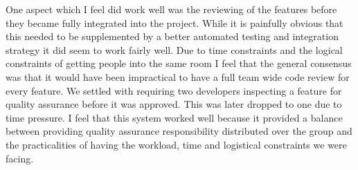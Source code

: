 \documentclass[paper=a4, fontsize=11pt]{scrartcl}	%
\numberwithin{equation}{section}															%
\numberwithin{figure}{section}																%
\numberwithin{table}{section}
\begin{document}
One aspect which I feel did work well was the reviewing of the features before they became fully integrated into the project. While it is painfully obvious that this needed to be supplemented by a better automated testing and integration strategy it did seem to work fairly well. Due to time constraints and the logical constraints of getting people into the same room I feel that the general consensus was that it would have been impractical to have a full team wide code review for every feature. We settled with requiring two developers inspecting a feature for quality assurance before it was approved. This was later dropped to one due to time pressure. I feel that this system worked well because it provided a balance between providing quality assurance responsibility distributed over the group and the practicalities of having the workload, time and logistical constraints we were facing. 

 
\end{document}
